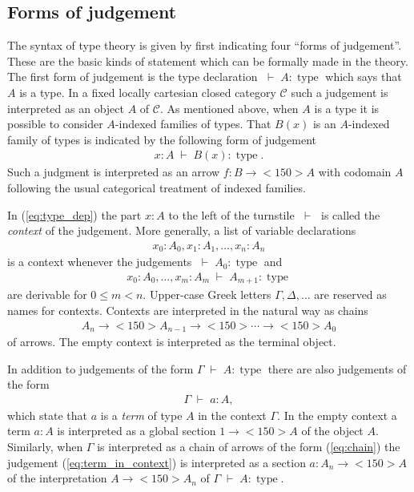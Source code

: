 \documentclass{amsart}
\newcommand{\judge}[2]{#1\;\vdash\;#2}
\newcommand{\type}{\operatorname{type}}
\theoremstyle{definition}
\theoremstyle{remark}
\begin{document}
\subsection{Forms of judgement}

The syntax of type theory is given by first indicating four ``forms  
of judgement''.  These are the basic kinds of statement which can be
formally made in the theory.  The first form of judgement is the type
declaration $\judge{}{A:\type}$ which says that $A$ is a type.  In a
fixed locally cartesian closed category $\mathcal{C}$ such a judgement
is interpreted as an object $A$ of $\mathcal{C}$.  As mentioned above,
when $A$ is a type it is possible to consider
$A$-indexed families of types.  That $B(x)$ is an $A$-indexed family
of types is indicated by the following form of judgement
\begin{align}\label{eq:type_dep}  
  \judge{x:A}{B(x):\type}.  
\end{align}
Such a judgment is interpreted as an arrow $f:B\to<150>A$ 
with codomain $A$ following the usual categorical treatment of indexed
families.

In (\ref{eq:type_dep}) the part $x:A$
to the left of the turnstile $\;\vdash\;$ is called the \emph{context} of the
judgement.  More generally, a list of variable declarations
\begin{align*}
  x_{0}:A_{0},x_{1}:A_{1},\ldots,x_{n}:A_{n}
\end{align*}
is a context whenever the judgements $\judge{}{A_{0}:\type}$ and 
\begin{align*}
  \judge{x_{0}:A_{0},\ldots,x_{m}:A_{m}}{A_{m+1}:\type}
\end{align*}
are derivable for $0\leq m<n$.  Upper-case Greek letters
$\Gamma,\Delta,\ldots$ are reserved as names for contexts.  Contexts
are interpreted in the natural way as chains 
\begin{align}\label{eq:chain}
  A_{n}\to<150>A_{n-1}\to<150>\cdots\to<150>A_{0}
\end{align}
of arrows.  The empty context is interpreted as the terminal object.

In addition to judgements of the form $\judge{\Gamma}{A:\type}$ there
are also judgements of the form
\begin{align}\label{eq:term_in_context}
  \judge{\Gamma}{a:A},
\end{align}
which state that $a$ is a \emph{term} of type $A$ in the context
$\Gamma$.  In the empty context a term $a:A$ is interpreted as a
global section $1\to<150>A$ of the object $A$.  Similarly, when $\Gamma$ is
interpreted as a chain of arrows of the form (\ref{eq:chain}) the
judgement (\ref{eq:term_in_context}) is interpreted as a section $a:A_{n}\to<150>A$ of the interpretation $A\to<150>A_{n}$ of $\judge{\Gamma}{A:\type}$.
\end{document}
